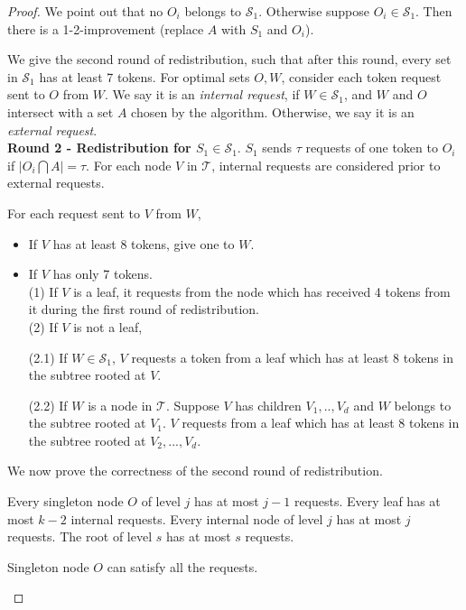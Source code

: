 \documentclass[runningheads,a4paper]{llncs}
\numberwithin{equation}{section}
\begin{document}
\begin{proof}
We point out that no $O_i$ belongs to $\mathscr{S}_1$. Otherwise suppose $O_i\in\mathscr{S}_1$. Then there is a 1-2-improvement (replace $A$ with $S_1$ and $O_i$).

We give the second round of redistribution, such that after this round, every set in $\mathscr{S}_1$ has at least 7 tokens.
For optimal sets $O,W$, consider each token request sent to $O$ from $W$. We say it is an \emph{internal request}, if $W\in\mathscr{S}_1$, and $W$ and $O$ intersect with a set $A$ chosen by the algorithm. Otherwise, we say it is an \emph{external request}. \\

\textbf{Round 2 - Redistribution for $S_1\in\mathscr{S}_1$}. $S_1$ sends $\tau$ requests of one token to $O_i$ if $|O_i\bigcap A|=\tau$. For each node $V$ in $\mathscr{T}$, internal requests are considered prior to external requests.

        For each request sent to $V$ from $W$,
        \begin{itemize}
            \item If $V$ has at least 8 tokens, give one to $W$.
            \item If $V$ has only 7 tokens. \\
            (1) If $V$ is a leaf, it requests from the node which has received 4 tokens from it during the first round of redistribution.\\
            (2) If $V$ is not a leaf,

            (2.1) If $W\in\mathscr{S}_1$, $V$ requests a token from a leaf which has at least 8 tokens in the subtree rooted at $V$.  

            (2.2) If $W$ is a node in $\mathscr{T}$. Suppose $V$ has children $V_1,..,V_d$ and $W$ belongs to the subtree rooted at $V_1$. $V$ requests from a leaf  which has at least 8 tokens in the subtree rooted at $V_2,...,V_d$.
        \end{itemize}


We now prove the correctness of the second round of redistribution.

\begin{proposition}
Every singleton node $O$ of level $j$ has at most $j-1$ requests. Every leaf has at most $k-2$ internal requests. Every internal node of level $j$ has at most $j$ requests. The root of level $s$ has at most $s$ requests.
\end{proposition}


\begin{proposition}
Singleton node $O$ can satisfy all the requests.
\end{proposition}



\end{proof}
\end{document}
